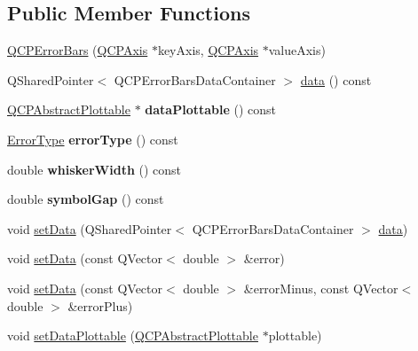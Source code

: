\subsection*{Public Member Functions}
\begin{DoxyCompactItemize}
\item 
\hyperlink{class_q_c_p_error_bars_a5cdcc33e5f173780c3d657e96216e5c1}{Q\+C\+P\+Error\+Bars} (\hyperlink{class_q_c_p_axis}{Q\+C\+P\+Axis} $\ast$key\+Axis, \hyperlink{class_q_c_p_axis}{Q\+C\+P\+Axis} $\ast$value\+Axis)
\item 
Q\+Shared\+Pointer$<$ Q\+C\+P\+Error\+Bars\+Data\+Container $>$ \hyperlink{class_q_c_p_error_bars_aeebd1b14f4c3573565efafd514988813}{data} () const
\item 
\mbox{\label{class_q_c_p_error_bars_ad7e5f1229db58d05bb3d8305d2504af8}} 
\hyperlink{class_q_c_p_abstract_plottable}{Q\+C\+P\+Abstract\+Plottable} $\ast$ {\bfseries data\+Plottable} () const
\item 
\mbox{\label{class_q_c_p_error_bars_a527e7df83c98709cef22a8447fee4f13}} 
\hyperlink{class_q_c_p_error_bars_a95f0220f11a72648b96480a85ce26474}{Error\+Type} {\bfseries error\+Type} () const
\item 
\mbox{\label{class_q_c_p_error_bars_ae5a292470366ec92b248753f83b8646e}} 
double {\bfseries whisker\+Width} () const
\item 
\mbox{\label{class_q_c_p_error_bars_a2c969749fa0db565a42b80db9da5f388}} 
double {\bfseries symbol\+Gap} () const
\item 
void \hyperlink{class_q_c_p_error_bars_a92b1980003255f5f7c05407a4d92aabc}{set\+Data} (Q\+Shared\+Pointer$<$ Q\+C\+P\+Error\+Bars\+Data\+Container $>$ \hyperlink{class_q_c_p_error_bars_aeebd1b14f4c3573565efafd514988813}{data})
\item 
void \hyperlink{class_q_c_p_error_bars_a2f33d68a7ec163b09017dce3d9d3abcc}{set\+Data} (const Q\+Vector$<$ double $>$ \&error)
\item 
void \hyperlink{class_q_c_p_error_bars_aac0cf070b957c11177e91b02bcb433c8}{set\+Data} (const Q\+Vector$<$ double $>$ \&error\+Minus, const Q\+Vector$<$ double $>$ \&error\+Plus)
\item 
void \hyperlink{class_q_c_p_error_bars_aabb42a964cfbf780cd1c79850c7cd989}{set\+Data\+Plottable} (\hyperlink{class_q_c_p_abstract_plottable}{Q\+C\+P\+Abstract\+Plottable} $\ast$plottable)

\end{DoxyCompactItemize}
